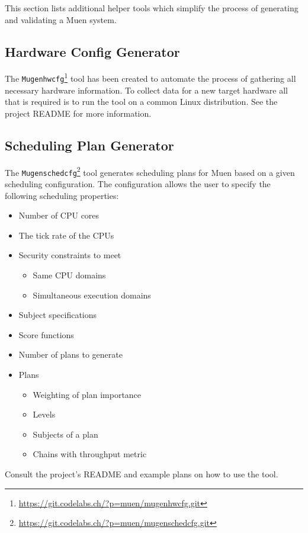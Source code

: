 \documentclass[a4paper,twoside,titlepage]{article}
\begin{document}
This section lists additional helper tools which simplify the process of
generating and validating a Muen system.

\subsection{Hardware Config Generator}
\label{sec:mugenhwcfg}
 The
\texttt{Mugenhwcfg}\footnote{\url{https://git.codelabs.ch/?p=muen/mugenhwcfg.git}}
tool has been created to automate the process of gathering all necessary
hardware information. To collect data for a new target hardware all that is
required is to run the tool on a common Linux distribution. See the project
README for more information.

\subsection{Scheduling Plan Generator}
\label{sec:mugenschedcfg}
The
\texttt{Mugenschedcfg}\footnote{\url{https://git.codelabs.ch/?p=muen/mugenschedcfg.git}}
tool generates scheduling plans for Muen based on a given scheduling
configuration.  The configuration allows the user to specify the following
scheduling properties:

\begin{itemize}
	\item Number of CPU cores
	\item The tick rate of the CPUs
	\item Security constraints to meet
	\begin{itemize}
		\item Same CPU domains
		\item Simultaneous execution domains
	\end{itemize}
	\item Subject specifications
	\item Score functions
	\item Number of plans to generate
	\item Plans
	\begin{itemize}
		\item Weighting of plan importance
		\item Levels
		\item Subjects of a plan
		\item Chains with throughput metric
	\end{itemize}
\end{itemize}

Consult the project's README and example plans on how to use the tool.
\end{document}
